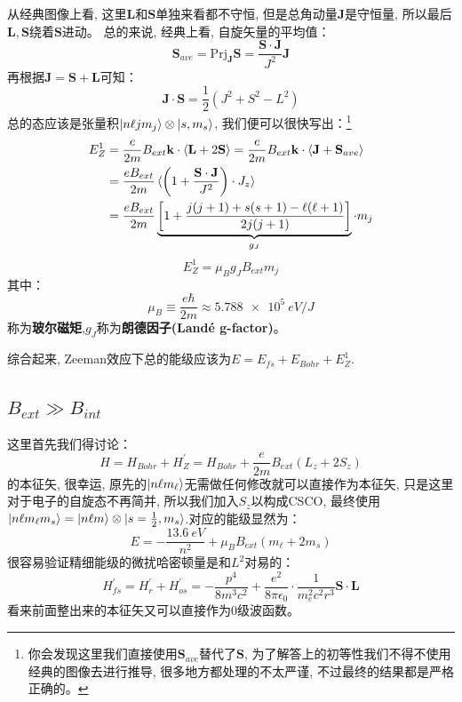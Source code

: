 \documentclass[a4paper,zihao=-4,linespread=1]{ctexrep}
\begin{document}
    从经典图像上看, 这里$\mathbf{L}$和$\mathbf{S}$单独来看都不守恒, 但是总角动量$\mathbf{J}$是守恒量, 所以最后$\mathbf{L},\mathbf{S}$绕着$\mathbf{S}$进动。
    总的来说, 经典上看, 自旋矢量的平均值：
    \begin{equation}
        \mathbf{S}_{ave}=\mathrm{Prj}_{\mathbf{J}}\mathbf{S}=\frac{\mathbf{S}\cdot\mathbf{J}}{J^2}\mathbf{J}
    \end{equation}
    再根据$\mathbf{J}=\mathbf{S}+\mathbf{L}$可知：
    \[\mathbf{J}\cdot\mathbf{S}=\frac{1}{2}\left(J^2+S^2-L^2\right)\]
    总的态应该是张量积$\ket{n\ell jm_j}\otimes\ket{s,m_s}$, 我们便可以很快写出：\footnote{你会发现这里我们直接使用$\mathbf{S}_{ave}$替代了$\mathbf{S}$, 为了解答上的初等性我们不得不使用经典的图像去进行推导, 很多地方都处理的不太严谨, 不过最终的结果都是严格正确的。}
    \begin{align*}
        E_Z^1&=\frac{e}{2m}B_{ext}\mathbf{k}\cdot\braket{\mathbf{L}+2\mathbf{S}}=\frac{e}{2m}B_{ext}\mathbf{k}\cdot\braket{\mathbf{J}+\mathbf{S}_{ave}}\\
        &=\frac{eB_{ext}}{2m}\braket{\left(1+\frac{\mathbf{S}\cdot\mathbf{J}}{J^2}\right)\cdot J_z}\\
        &=\frac{eB_{ext}}{2m}\underbrace{\left[1+\frac{j(j+1)+s(s+1)-\ell(\ell+1)}{2j(j+1)}\right]}_{g_J}\cdot m_j
    \end{align*}
    \begin{equation}
        \label{eq:7.25}
        \boxed{E_Z^1=\mu_B g_J B_{ext}m_j}
    \end{equation}
    其中：
    \begin{equation}
        \mu_B\equiv\frac{e\hbar}{2m}\approx\SI{5.788e5}{eV/J}
    \end{equation}
    称为\textbf{玻尔磁矩},$g_J$称为\textbf{朗德因子(Landé g-factor)}。

    综合起来, Zeeman效应下总的能级应该为$E=E_{fs}+E_{Bohr}+E_{Z}^1$.
    \subsection*{$B_{ext}\gg B_{int}$}
    这里首先我们得讨论：
    \[H=H_{Bohr}+H_Z^\prime=H_{Bohr}+\frac{e}{2m}B_{ext}\left(L_z+2S_z\right)\]
    的本征矢, 很幸运, 原先的$\ket{n\ell m_\ell}$无需做任何修改就可以直接作为本征矢, 只是这里对于电子的自旋态不再简并, 所以我们加入$S_z$以构成CSCO, 最终使用$\ket{n\ell m_\ell m_s}=
    \ket{n\ell m}\otimes\ket{s=\frac{1}{2},m_s}$.对应的能级显然为：
    \begin{equation}
        E=-\frac{\SI{13.6}{eV}}{n^2}+\mu_BB_{ext}\left(m_\ell+2m_s \right)
    \end{equation}
    很容易验证精细能级的微扰哈密顿量是和$L^2$对易的：
    \begin{equation}
        H_{fs}^\prime=H_r^\prime+H_{os}^\prime=-\frac{p^4}{8m^3c^2}+\frac{e^2}{8\pi\epsilon_0}\cdot\frac{1}{m_e^2c^2r^3}\mathbf{S}\cdot\mathbf{L}
    \end{equation}
    看来前面整出来的本征矢又可以直接作为0级波函数。
\end{document}

